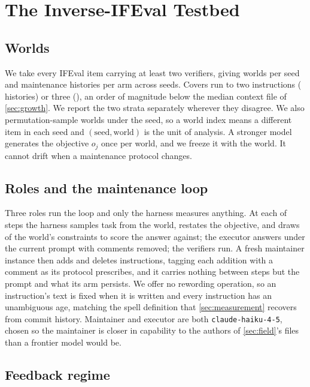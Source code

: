 
\section{The Inverse-IFEval Testbed}
\label{sec:appendix:testbed}

\subsection{Worlds}
\label{sec:appendix:worlds}

We take every IFEval item carrying at least two verifiers, giving \LabWorlds{} worlds per seed and
\LabUnits{} maintenance histories per arm across \LabSeeds{} seeds. Covers run to two instructions
(\LabStratTwoN{} histories) or three (\LabStratThreeN{}), an order of magnitude below the median
context file of \autoref{sec:growth}. We report the two strata separately wherever they disagree.
We also permutation-sample worlds under the seed, so a world index means a different item in each
seed and $(\text{seed}, \text{world})$ is the unit of analysis. A stronger model generates the
objective $o_j$ once per world, and we freeze it with the world. It cannot drift when a maintenance
protocol changes.

\subsection{Roles and the maintenance loop}
\label{sec:appendix:loop}

Three roles run the loop and only the harness measures anything. At each of \LabT{} steps the
harness samples \LabL{} task from the world, restates the objective, and draws \LabK{} of the
world's constraints to score the answer against; the executor answers under the current prompt with
comments removed; the verifiers run. A fresh maintainer instance then adds and deletes
instructions, tagging each addition with a comment as its protocol prescribes, and it carries
nothing between steps but the prompt and what its arm persists. We offer no rewording operation, so
an instruction's text is fixed when it is written and every instruction has an unambiguous age,
matching the spell definition that \autoref{sec:measurement} recovers from commit history. Maintainer
and executor are both \texttt{claude-haiku-4-5}, chosen so the maintainer is closer in capability
to the authors of \autoref{sec:field}'s files than a frontier model would be.

\subsection{Feedback regime}
\label{sec:appendix:regime}

